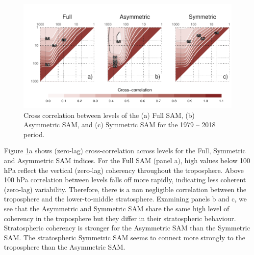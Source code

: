 \documentclass[]{ametsocV5}
\begin{document}
\begin{figure}
\includegraphics{cross-correlation-1} \caption[Cross correlation between levels of the (a) Full SAM, (b) Asymmetric SAM, and (c) Symmetric SAM for the 1979 -- 2018 period]{Cross correlation between levels of the (a) Full SAM, (b) Asymmetric SAM, and (c) Symmetric SAM for the 1979 -- 2018 period.}\label{fig:cross-correlation}
\end{figure}

Figure \ref{fig:cross-correlation}a shows (zero-lag) cross-correlation across levels for the Full, Symmetric and Asymmetric SAM indices. For the Full SAM (panel a), high values below 100 hPa reflect the vertical (zero-lag) coherency throughout the troposphere. Above 100 hPa correlation between levels falls off more rapidly, indicating less coherent (zero-lag) variability. Therefore, there is a non negligible correlation between the troposphere and the lower-to-middle stratosphere. Examining panels b and c, we see that the Asymmetric and Symmetric SAM share the same high level of coherency in the troposphere but they differ in their stratospheric behaviour. Stratospheric coherency is stronger for the Asymmetric SAM than the Symmetric SAM. The stratospheric Symmetric SAM seems to connect more strongly to the troposphere than the Asymmetric SAM.
\end{document}
